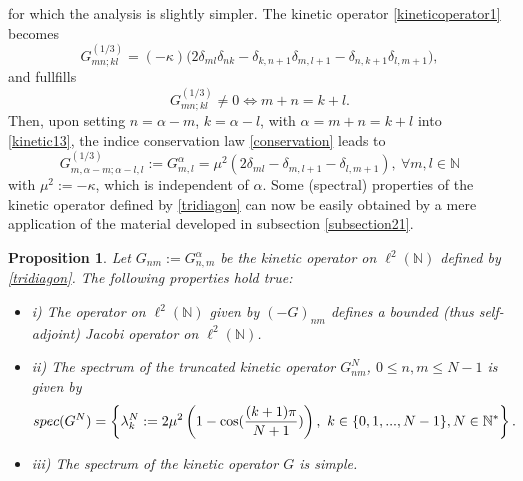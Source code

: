 \documentclass[a4paper,11pt,twoside]{article}
\numberwithin{equation}{section}
\newtheorem{proposition}[Theorem]{Proposition}
\theoremstyle{nonumberplain}
\begin{document}
for which the analysis is slightly simpler. The kinetic operator \eqref{kineticoperator1} becomes
\begin{equation}
 G^{(1/3)}_{mn;kl}=(-\kappa)\big(2\delta_{ml}\delta_{nk} - \delta_{k,n+1}\delta_{m,l+1}-\delta_{n,k+1}\delta_{l,m+1}\big)\label{kinetic13},
\end{equation}
and fullfills
\begin{equation}
G^{(1/3)}_{mn;kl}\ne0\iff m+n=k+l\label{conservation}.
\end{equation}
Then, upon setting $n=\alpha-m$, $k=\alpha-l$, with $\alpha=m+n=k+l$ into \eqref{kinetic13}, the indice conservation law \eqref{conservation} leads to
\begin{equation}
G^{(1/3)}_{m,\alpha-m;\alpha-l,l}:=G^{\alpha}_{m,l}=\mu^2(2\delta_{ml}- \delta_{m,l+1}-\delta_{l,m+1}),\ \forall m,l\in\mathbb{N}\label{tridiagon}
\end{equation}
with $\mu^2:=-\kappa$, which is independent of $\alpha$. Some (spectral) properties of the kinetic operator defined by \eqref{tridiagon} can now be easily obtained by a mere application of the material developed in subsection \ref{subsection21}.
\begin{proposition}\label{kinetic-G}
Let $G_{nm}:=G^{\alpha}_{n,m}$ be the kinetic operator on $\ell^2(\mathbb{N})$ defined by \eqref{tridiagon}. The following properties hold true:
\begin{itemize}
\vspace*{-4pt}
\setlength{\itemsep}{-1pt}
\item i) The operator on $\ell^2(\mathbb{N})$ given by $(-G)_{nm}$ defines a bounded (thus self-adjoint) Jacobi operator on $\ell^2(\mathbb{N})$.
\item ii) The spectrum of the truncated kinetic operator $G^N_{nm}$, $0\le n,m\le N-1$ is given by 
\begin{equation}
spec(G^N)=\left\{\lambda^N_k:=2\mu^2\left(1-\cos({{(k+1)\pi}\over{N+1}})\right), \ k\in\{0,1,...,N-1\}, N\in\mathbb{N}^*\right\}.\label{spectrum1}
\end{equation}
\item iii) The spectrum of the kinetic operator $G$ is simple.
\end{itemize}
\end{proposition}
\end{document}
